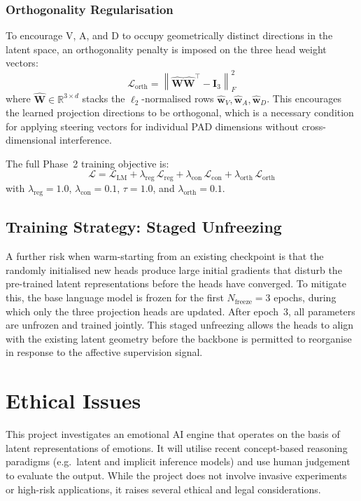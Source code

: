 \documentclass[12pt,twoside]{report}
\begin{document}
\subsection{Orthogonality Regularisation}

To encourage V, A, and D to occupy geometrically distinct directions in the latent space, an orthogonality penalty is imposed on the three head weight vectors:
\[
    \mathcal{L}_{\text{orth}} = \left\| \hat{\mathbf{W}}\hat{\mathbf{W}}^\top - \mathbf{I}_3 \right\|_F^2
\]
where $\hat{\mathbf{W}} \in \mathbb{R}^{3 \times d}$ stacks the $\ell_2$-normalised rows $\hat{\mathbf{w}}_V, \hat{\mathbf{w}}_A, \hat{\mathbf{w}}_D$.
This encourages the learned projection directions to be orthogonal, which is a necessary condition for applying steering vectors for individual PAD dimensions without cross-dimensional interference.

The full Phase~2 training objective is:
\[
    \mathcal{L} = \mathcal{L}_{\text{LM}}
    + \lambda_{\text{reg}}\,\mathcal{L}_{\text{reg}}
    + \lambda_{\text{con}}\,\mathcal{L}_{\text{con}}
    + \lambda_{\text{orth}}\,\mathcal{L}_{\text{orth}}
\]
with $\lambda_{\text{reg}} = 1.0$, $\lambda_{\text{con}} = 0.1$, $\tau = 1.0$, and $\lambda_{\text{orth}} = 0.1$.

\section{Training Strategy: Staged Unfreezing}

A further risk when warm-starting from an existing checkpoint is that the randomly initialised new heads produce large initial gradients that disturb the pre-trained latent representations before the heads have converged.
To mitigate this, the base language model is frozen for the first $N_{\text{freeze}} = 3$ epochs, during which only the three projection heads are updated.
After epoch~3, all parameters are unfrozen and trained jointly.
This staged unfreezing allows the heads to align with the existing latent geometry before the backbone is permitted to reorganise in response to the affective supervision signal.


\chapter{Ethical Issues}

This project investigates an emotional AI engine that operates on the basis of latent representations of emotions. It will utilise recent concept-based reasoning paradigms (e.g.\ latent and implicit inference models) and use human judgement to evaluate the output. While the project does not involve invasive experiments or high-risk applications, it raises several ethical and legal considerations.
\end{document}
